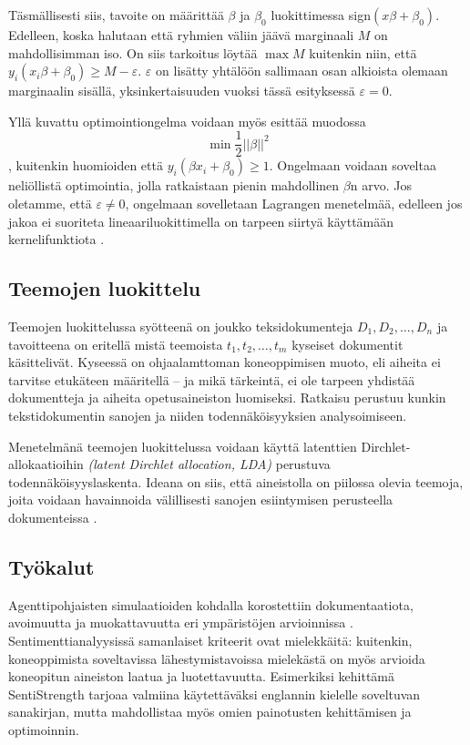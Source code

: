 \documentclass[finnish,gradu,twoside,12pt]{tktltiki}
\begin{document}
{Täsmällisesti siis, tavoite on määrittää $\beta$ ja $\beta_0$ luokittimessa sign$( x \beta + \beta_0)$. Edelleen, koska halutaan että ryhmien väliin jäävä marginaali $M$ on mahdollisimman iso. On siis tarkoitus löytää $\max M$ kuitenkin niin, että $y_i( x_i \beta + \beta_0 ) \geq M - \varepsilon$. $\varepsilon$ on lisätty yhtälöön sallimaan osan alkioista olemaan marginaalin sisällä, yksinkertaisuuden vuoksi tässä esityksessä $\varepsilon = 0$.

Yllä kuvattu optimointiongelma voidaan myös esittää muodossa $$ \min \frac{1}{2} || \beta ||^2 $$, kuitenkin huomioiden että $ y_i( \beta x_i + \beta_0 ) \geq 1$. Ongelmaan voidaan soveltaa neliöllistä optimointia, jolla ratkaistaan pienin mahdollinen $\beta$n arvo. Jos oletamme, että $\varepsilon \neq 0$, ongelmaan  sovelletaan Lagrangen menetelmää, edelleen jos jakoa ei suoriteta lineaariluokittimella on tarpeen siirtyä käyttämään kernelifunktiota \citep{vapnik1982estimation,cortes95,Hastie2009}.

\subsection{Teemojen luokittelu}

Teemojen luokittelussa syötteenä on joukko teksidokumenteja $D_1, D_2, \ldots, D_n$ ja tavoitteena on eritellä mistä teemoista $t_1, t_2, \ldots, t_m$ kyseiset dokumentit käsittelivät. Kyseessä on ohjaalamttoman koneoppimisen muoto, eli aiheita ei tarvitse etukäteen määritellä -- ja mikä tärkeintä, ei ole tarpeen yhdistää dokumentteja ja aiheita opetusaineiston luomiseksi. Ratkaisu perustuu kunkin tekstidokumentin sanojen ja niiden todennäköisyyksien analysoimiseen.

Menetelmänä teemojen luokittelussa voidaan käyttä latenttien Dirchlet-allokaatioihin \textit{(latent Dirchlet allocation, LDA)} perustuva todennäköisyyslaskenta. Ideana on siis, että aineistolla on piilossa olevia teemoja, joita voidaan havainnoida välillisesti sanojen esiintymisen perusteella dokumenteissa \citep{Blei2010,Blei2003}.

\subsection*{Työkalut}

Agenttipohjaisten simulaatioiden kohdalla korostettiin dokumentaatiota, avoimuutta ja muokattavuutta eri ympäristöjen arvioinnissa \citep{Tobias2004}. Sentimenttianalyysissä samanlaiset kriteerit ovat mielekkäitä: kuitenkin, koneoppimista soveltavissa lähestymistavoissa mielekästä on myös arvioida koneopitun aineiston laatua ja luotettavuutta. Esimerkiksi \citet{Thelwall2010} kehittämä SentiStrength tarjoaa valmiina käytettäväksi englannin kielelle soveltuvan sanakirjan, mutta mahdollistaa myös omien painotusten kehittämisen ja optimoinnin.

}
\end{document}
